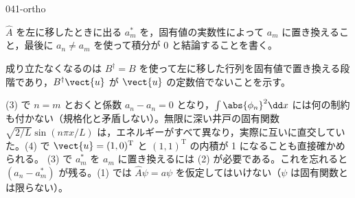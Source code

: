 \documentclass[uplatex,dvipdfmx,a4paper,11pt]{jsarticle}
\begin{document}
\begin{kaisetsu}{041-ortho}
\begin{ronten}
  \item {} $\hat{A}$ を左に移したときに出る $a_{m}^{*}$ を，固有値の実数性によって $a_{m}$ に置き換えること，最後に $a_{n}\neq a_{m}$ を使って積分が 0 と結論することを書く。
  \item {} 成り立たなくなるのは $B^{\dagger}=B$ を使って左に移した行列を固有値で置き換える段階であり，$B^{\dagger}\vect{u}$ が $\vect{u}$ の定数倍でないことを示す。
\end{ronten}
\kenzan (3) で $n=m$ とおくと係数 $a_{n}-a_{n}=0$ となり，$\int\abs{\phi_{n}}^{2}\dd x$ には何の制約も付かない（規格化と矛盾しない）。無限に深い井戸の固有関数 $\sqrt{2/L}\sin(n\pi x/L)$ は，エネルギーがすべて異なり，実際に互いに直交していた。(4) で $\vect{u}=(1,0)^{\mathrm{T}}$ と $(1,1)^{\mathrm{T}}$ の内積が 1 になることも直接確かめられる。
\tsumazuki (3) で $a_{m}^{*}$ を $a_{m}$ に置き換えるには (2) が必要である。これを忘れると $(a_{n}-a_{m}^{*})$ が残る。(1) では $\hat{A}\psi=a\psi$ を仮定してはいけない（$\psi$ は固有関数とは限らない）。
\end{kaisetsu}
\end{document}
